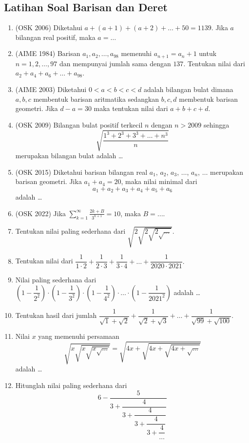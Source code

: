 \subsection{Latihan Soal Barisan dan Deret}
\begin{enumerate}
\item (OSK 2006) Diketahui $a+(a+1)+(a+2)+\dots+50=1139$. Jika $a$ bilangan real positif, maka $a=\dots$

\item (AIME 1984) Barisan $a_1,a_2,\dots,a_{98}$ memenuhi $a_{n+1}=a_n+1$ untuk $n=1,2,\dots,97$ dan mempunyai jumlah sama dengan $137$. Tentukan nilai dari $a_2+a_4+a_6+\dots+a_{98}$.

\item (AIME 2003) Diketahui $0<a<b<c<d$ adalah bilangan bulat dimana $a,b,c$ membentuk barisan aritmatika sedangkan $b,c,d$ membentuk barisan geometri. Jika $d-a=30$ maka tentukan nilai dari $a+b+c+d$.

\item (OSK 2009) Bilangan bulat positif terkecil $n$ dengan $n> 2009$ sehingga $$\sqrt{\dfrac{1^3+2^3+3^3+\dots+n^3}{n}}$$
merupakan bilangan bulat adalah \dots

\item (OSK 2015) Diketahui barisan bilangan real $a_1$, $a_2$, $a_3$, $\dots$, $a_n$, $\dots$ merupakan barisan geometri. Jika $a_1+a_4 = 20$, maka nilai minimal dari
\[a_1 + a_2 + a_3 + a_4 + a_5 + a_6\]
adalah \ldots

\item (OSK 2022) Jika $\sum_{k=1}^{\infty} \frac{2k + B}{3^{k+1}} = 10$, maka $B = \ldots $.

\item Tentukan nilai paling sederhana dari $\sqrt{2\sqrt{2\sqrt{2\sqrt{\dots}}}}$.

\item Tentukan nilai dari $\dfrac{1}{1\cdot2}+\dfrac{1}{2\cdot 3}+\dfrac{1}{3 \cdot 4}+\dots+\dfrac{1}{2020 \cdot 2021}.$

\item  Nilai paling sederhana dari $\left(1-\dfrac{1}{2^2}\right)\cdot\left(1-\dfrac{1}{3^2}\right)\cdot\left(1-\dfrac{1}{4^2}\right)\cdot\dots\cdot\left(1-\dfrac{1}{2021^2}\right)$ adalah \dots

\item Tentukan hasil dari jumlah $\dfrac{1}{\sqrt{1}+\sqrt{2}}+\dfrac{1}{\sqrt{2}+\sqrt{3}}+\dots+\dfrac{1}{\sqrt{99}+\sqrt{100}}.$

\item Nilai $x$ yang memenuhi persamaan
$$\sqrt{x\sqrt{x\sqrt{x\sqrt{\dots}}}}=\sqrt{4x+\sqrt{4x+\sqrt{4x+\sqrt{\dots}}}}$$
adalah \dots

\item Hitunglah nilai paling sederhana dari
$$6-\dfrac{5}{3+\dfrac{4}{3+\dfrac{4}{3+\dfrac{4}{3+\dfrac{4}{\dots}}}}}$$
\end{enumerate}